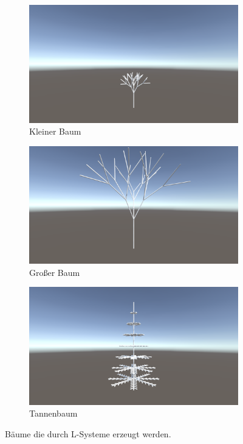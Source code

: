 \begin{figure}[ht]
    \begin{subfigure}[t]{.3\textwidth}
        \centering
        \includegraphics[width=\linewidth]{chapters/05_Technische_Umsetzung/03_World_Generation/Performance/small.png}
        \caption*{Kleiner Baum}
    \end{subfigure}
    \hfill
    \begin{subfigure}[t]{.3\textwidth}
        \centering
        \includegraphics[width=\linewidth]{chapters/05_Technische_Umsetzung/03_World_Generation/Performance/big.png}
        \caption*{Großer Baum}
    \end{subfigure}
    \hfill
    \begin{subfigure}[t]{.3\textwidth}
        \centering
        \includegraphics[width=\linewidth]{chapters/05_Technische_Umsetzung/03_World_Generation/Performance/tannenbaum.png}
        \caption*{Tannenbaum}
    \end{subfigure}
    \caption{Bäume die durch L-Systeme erzeugt werden.}\label{fig:Trees}
\end{figure}


